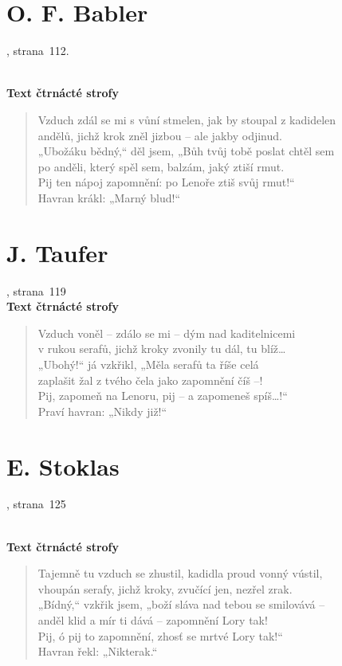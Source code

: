 \documentclass[dp.tex]{subfiles}
\begin{document}
\section*{O. F. Babler}
, strana~112.
\begin{samepage}
\\\textbf{Text čtrnácté strofy}
\begin{verse}
Vzduch zdál se mi s vůní stmelen, jak by stoupal z kadidelen\\
andělů, jichž krok zněl jizbou – ale jakby odjinud.\\
„Ubožáku bědný,“ děl jsem, „Bůh tvůj tobě poslat chtěl sem\\
po anděli, který spěl sem, balzám, jaký ztiší rmut.\\
Pij ten nápoj zapomnění: po Lenoře ztiš svůj rmut!“\\
Havran krákl: „Marný blud!“
\end{verse}
\end{samepage}

\section*{J. Taufer}
, strana~119
\\\textbf{Text čtrnácté strofy}
\begin{verse}
Vzduch voněl – zdálo se mi – dým nad kaditelnicemi\\
v rukou serafů, jichž kroky zvonily tu dál, tu blíž\ldots\\
„Ubohý!“ já vzkřikl, „Měla serafů ta říše celá\\
zaplašit žal z tvého čela jako zapomnění číš –!\\
Pij, zapomeň na Lenoru, pij -- a zapomeneš spíš\ldots!“\\
\hspace*{0.8cm}Praví havran: „Nikdy již!“
\end{verse}

\section*{E. Stoklas}
, strana~125
\begin{samepage}
\\\textbf{Text čtrnácté strofy}
\begin{verse}
Tajemně tu vzduch se zhustil, kadidla proud vonný vústil,\\
vhoupán serafy, jichž kroky, zvučící jen, nezřel zrak.\\
„Bídný,“ vzkřik jsem, „boží sláva nad tebou se smilovává --\\
anděl klid a mír ti dává -- zapomnění Lory tak!\\
Pij, ó pij to zapomnění, zhosť se mrtvé Lory tak!“\\
\hspace*{0.8cm}Havran řekl: „Nikterak.“
\end{verse}
\end{samepage}
\end{document}
